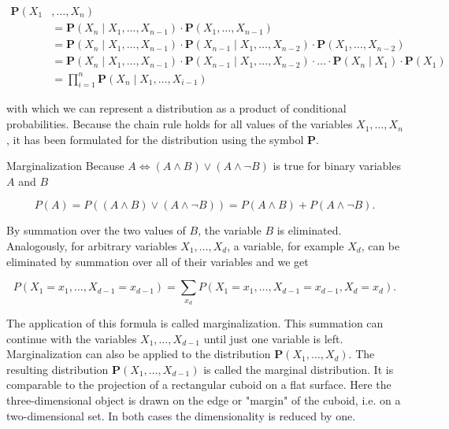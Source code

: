\documentclass[10pt]{book}
\begin{document}
\begin{align*}
\boldsymbol{P}\left(X_{1}\right. & \left., \ldots, X_{n}\right) \\
& =\boldsymbol{P}\left(X_{n} \mid X_{1}, \ldots, X_{n-1}\right) \cdot \boldsymbol{P}\left(X_{1}, \ldots, X_{n-1}\right) \\
& =\boldsymbol{P}\left(X_{n} \mid X_{1}, \ldots, X_{n-1}\right) \cdot \boldsymbol{P}\left(X_{n-1} \mid X_{1}, \ldots, X_{n-2}\right) \cdot \boldsymbol{P}\left(X_{1}, \ldots, X_{n-2}\right) \\
& =\boldsymbol{P}\left(X_{n} \mid X_{1}, \ldots, X_{n-1}\right) \cdot \boldsymbol{P}\left(X_{n-1} \mid X_{1}, \ldots, X_{n-2}\right) \cdot \ldots \cdot \boldsymbol{P}\left(X_{n} \mid X_{1}\right) \cdot \boldsymbol{P}\left(X_{1}\right) \\
& =\prod_{i=1}^{n} \boldsymbol{P}\left(X_{n} \mid X_{1}, \ldots, X_{i-1}\right) \tag{7.1}
\end{align*}


with which we can represent a distribution as a product of conditional probabilities. Because the chain rule holds for all values of the variables $X_{1}, \ldots, X_{n}$, it has been formulated for the distribution using the symbol $\boldsymbol{P}$.

Marginalization
Because $A \Leftrightarrow(A \wedge B) \vee(A \wedge \neg B)$ is true for binary variables $A$ and $B$

$$
P(A)=P((A \wedge B) \vee(A \wedge \neg B))=P(A \wedge B)+P(A \wedge \neg B) .
$$

By summation over the two values of $B$, the variable $B$ is eliminated. Analogously, for arbitrary variables $X_{1}, \ldots, X_{d}$, a variable, for example $X_{d}$, can be eliminated by summation over all of their variables and we get

$$
P\left(X_{1}=x_{1}, \ldots, X_{d-1}=x_{d-1}\right)=\sum_{x_{d}} P\left(X_{1}=x_{1}, \ldots, X_{d-1}=x_{d-1}, X_{d}=x_{d}\right) .
$$

The application of this formula is called marginalization. This summation can continue with the variables $X_{1}, \ldots, X_{d-1}$ until just one variable is left. Marginalization can also be applied to the distribution $\boldsymbol{P}\left(X_{1}, \ldots, X_{d}\right)$. The resulting distribution $\boldsymbol{P}\left(X_{1}, \ldots, X_{d-1}\right)$ is called the marginal distribution. It is comparable to the projection of a rectangular cuboid on a flat surface. Here the three-dimensional object is drawn on the edge or "margin" of the cuboid, i.e. on a two-dimensional set. In both cases the dimensionality is reduced by one.
\end{document}
